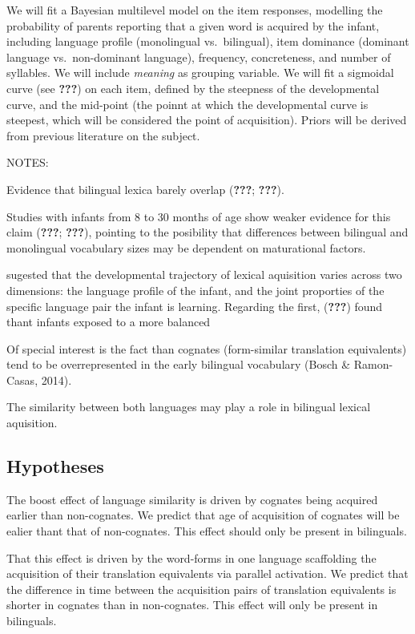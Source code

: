 \documentclass[english,man,man,floatsintext]{apa6}
\providecommand{\tightlist}{%
  \setlength{\itemsep}{0pt}\setlength{\parskip}{0pt}}
\begin{document}
We will fit a Bayesian multilevel model on the item responses, modelling the probability of parents reporting that a given word is acquired by the infant, including language profile (monolingual vs.~bilingual), item dominance (dominant language vs.~non-dominant language), frequency, concreteness, and number of syllables. We will include \emph{meaning} as grouping variable. We will fit a sigmoidal curve (see {\textbf{???}}) on each item, defined by the steepness of the developmental curve, and the mid-point (the poinnt at which the developmental curve is steepest, which will be considered the point of acquisition). Priors will be derived from previous literature on the subject.

NOTES:

Evidence that bilingual lexica barely overlap ({\textbf{???}}; {\textbf{???}}).

Studies with infants from 8 to 30 months of age show weaker evidence for this claim ({\textbf{???}}; {\textbf{???}}), pointing to the posibility that differences between bilingual and monolingual vocabulary sizes may be dependent on maturational factors.

sugested that the developmental trajectory of lexical aquisition varies across two dimensions: the language profile of the infant, and the joint proporties of the specific language pair the infant is learning. Regarding the first, ({\textbf{???}}) found thant infants exposed to a more balanced

Of special interest is the fact than cognates (form-similar translation equivalents) tend to be overrepresented in the early bilingual vocabulary (Bosch \& Ramon-Casas, 2014).

The similarity between both languages may play a role in bilingual lexical aquisition.

\hypertarget{hypotheses}{%
\subsection{Hypotheses}\label{hypotheses}}

\begin{description}
\tightlist
\item[Hypothesis 1]
The boost effect of language similarity is driven by cognates being acquired earlier than non-cognates. We predict that age of acquisition of cognates will be ealier thant that of non-cognates. This effect should only be present in bilinguals.
\item[Hypothesis 2]
That this effect is driven by the word-forms in one language scaffolding the acquisition of their translation equivalents via parallel activation. We predict that the difference in time between the acquisition pairs of translation equivalents is shorter in cognates than in non-cognates. This effect will only be present in bilinguals.
\end{description}
\end{document}
